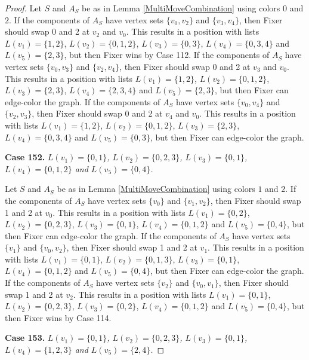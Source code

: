 \documentclass[12pt]{amsart}
\theoremstyle{plain}
\theoremstyle{definition}
\theoremstyle{remark}
\begin{document}
\begin{proof}
Let $S$ and $A_S$ be as in Lemma \ref{MultiMoveCombination} using colors $0$ and $2$. If the components of $A_S$ have vertex sets $\{v_0, v_2\}$ and $\{v_3, v_4\}$, then Fixer should swap 0 and 2 at $v_2$ and $v_0$. This results in a position with lists $L(v_1) = \{1, 2\}$, $L(v_2) = \{0, 1, 2\}$, $L(v_3) = \{0, 3\}$, $L(v_4) = \{0, 3, 4\}$ and $L(v_5) = \{2, 3\}$, but then Fixer wins by Case 112.
If the components of $A_S$ have vertex sets $\{v_0, v_3\}$ and $\{v_2, v_4\}$, then Fixer should swap 0 and 2 at $v_3$ and $v_0$. This results in a position with lists $L(v_1) = \{1, 2\}$, $L(v_2) = \{0, 1, 2\}$, $L(v_3) = \{2, 3\}$, $L(v_4) = \{2, 3, 4\}$ and $L(v_5) = \{2, 3\}$, but then Fixer can edge-color the graph.
If the components of $A_S$ have vertex sets $\{v_0, v_4\}$ and $\{v_2, v_3\}$, then Fixer should swap 0 and 2 at $v_4$ and $v_0$. This results in a position with lists $L(v_1) = \{1, 2\}$, $L(v_2) = \{0, 1, 2\}$, $L(v_3) = \{2, 3\}$, $L(v_4) = \{0, 3, 4\}$ and $L(v_5) = \{0, 3\}$, but then Fixer can edge-color the graph.

\noindent\textbf{Case 152.  }\textit{$L(v_1) = \{0, 1\}$, $L(v_2) = \{0, 2, 3\}$, $L(v_3) = \{0, 1\}$, $L(v_4) = \{0, 1, 2\}$ and $L(v_5) = \{0, 4\}$.}

Let $S$ and $A_S$ be as in Lemma \ref{MultiMoveCombination} using colors $1$ and $2$. If the components of $A_S$ have vertex sets $\{v_0\}$ and $\{v_1, v_2\}$, then Fixer should swap 1 and 2 at $v_0$. This results in a position with lists $L(v_1) = \{0, 2\}$, $L(v_2) = \{0, 2, 3\}$, $L(v_3) = \{0, 1\}$, $L(v_4) = \{0, 1, 2\}$ and $L(v_5) = \{0, 4\}$, but then Fixer can edge-color the graph.
If the components of $A_S$ have vertex sets $\{v_1\}$ and $\{v_0, v_2\}$, then Fixer should swap 1 and 2 at $v_1$. This results in a position with lists $L(v_1) = \{0, 1\}$, $L(v_2) = \{0, 1, 3\}$, $L(v_3) = \{0, 1\}$, $L(v_4) = \{0, 1, 2\}$ and $L(v_5) = \{0, 4\}$, but then Fixer can edge-color the graph.
If the components of $A_S$ have vertex sets $\{v_2\}$ and $\{v_0, v_1\}$, then Fixer should swap 1 and 2 at $v_2$. This results in a position with lists $L(v_1) = \{0, 1\}$, $L(v_2) = \{0, 2, 3\}$, $L(v_3) = \{0, 2\}$, $L(v_4) = \{0, 1, 2\}$ and $L(v_5) = \{0, 4\}$, but then Fixer wins by Case 114.

\noindent\textbf{Case 153.  }\textit{$L(v_1) = \{0, 1\}$, $L(v_2) = \{0, 2, 3\}$, $L(v_3) = \{0, 1\}$, $L(v_4) = \{1, 2, 3\}$ and $L(v_5) = \{2, 4\}$.}


\end{proof}
\end{document}
